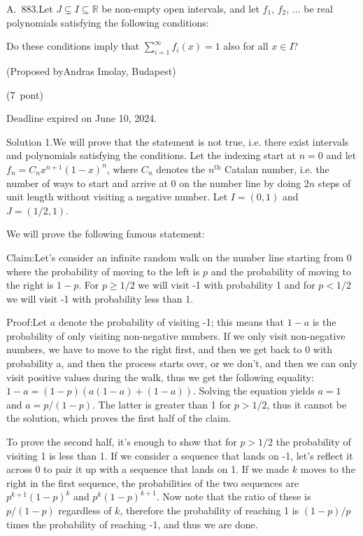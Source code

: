 \documentclass{article}
\begin{document}
A. 883.Let \(\displaystyle J \subsetneq I \subseteq \mathbb{R}\) be non-empty open intervals, and let \(\displaystyle f_1\), \(\displaystyle f_2\), \(\displaystyle \ldots\) be real polynomials satisfying the following conditions:

Do these conditions imply that \(\displaystyle \sum_{i=1}^\infty f_i(x)=1\) also for all \(\displaystyle x \in I\)?

(Proposed byAndras Imolay, Budapest)

(7 pont)

Deadline expired on June 10, 2024.

Solution 1.We will prove that the statement is not true, i.e. there exist intervals and polynomials satisfying the conditions. Let the indexing start at \(\displaystyle n=0\) and let \(\displaystyle f_n=C_nx^{n+1}(1-x)^n\), where \(\displaystyle C_n\) denotes the \(\displaystyle n^{\text{th}}\) Catalan number, i.e. the number of ways to start and arrive at 0 on the number line by doing \(\displaystyle 2n\) steps of unit length without visiting a negative number. Let \(\displaystyle I=(0,1)\) and \(\displaystyle J=(1/2,1)\).

We will prove the following famous statement:

Claim:Let's consider an infinite random walk on the number line starting from 0 where the probability of moving to the left is \(\displaystyle p\) and the probability of moving to the right is \(\displaystyle 1-p\). For \(\displaystyle p\ge 1/2\) we will visit -1 with probability 1 and for \(\displaystyle p<1/2\) we will visit -1 with probability less than 1.

Proof:Let \(\displaystyle a\) denote the probability of visiting -1; this means that \(\displaystyle 1-a\) is the probability of only visiting non-negative numbers. If we only visit non-negative numbers, we have to move to the right first, and then we get back to 0 with probability a, and then the process starts over, or we don't, and then we can only visit positive values during the walk, thus we get the following equality: \(\displaystyle 1-a=(1-p)(a(1-a)+(1-a))\). Solving the equation yields \(\displaystyle a=1\) and \(\displaystyle a=p/(1-p)\). The latter is greater than 1 for \(\displaystyle p>1/2\), thus it cannot be the solution, which proves the first half of the claim.

To prove the second half, it's enough to show that for \(\displaystyle p>1/2\) the probability of visiting 1 is less than 1. If we consider a sequence that lands on -1, let's reflect it across 0 to pair it up with a sequence that lands on 1. If we made \(\displaystyle k\) moves to the right in the first sequence, the probabilities of the two sequences are \(\displaystyle p^{k+1}(1-p)^k\) and \(\displaystyle p^k(1-p)^{k+1}\). Now note that the ratio of these is \(\displaystyle p/(1-p)\) regardless of \(\displaystyle k\), therefore the probability of reaching 1 is \(\displaystyle (1-p)/p\) times the probability of reaching -1, and thus we are done.
\end{document}
